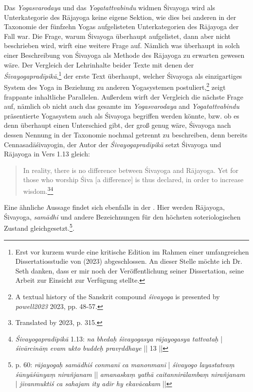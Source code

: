 Das \textit{Yogasvarodaya} und das \textit{Yogatattvabindu} widmen Śivayoga wird als Unterkategorie des Rājayoga keine eigene Sektion, wie dies bei anderen in der Taxonomie der fünfzehn Yogas aufgelisteten Unterkategorien des Rājayoga der Fall war. Die Frage, warum Śivayoga überhaupt aufgelistet, dann aber nicht beschrieben wird, wirft eine weitere Frage auf. Nämlich was überhaupt in solch einer Beschreibung von Śivayoga als Methode des Rājayoga zu erwarten gewesen wäre. Der Vergleich der Lehrinhalte beider Texte mit denen der \textit{Śivayogapradīpikā},\footnote{Erst vor kurzem wurde eine kritische Edition im Rahmen einer umfangreichen Dissertatiosstudie von \citeauthor{powell2023} (2023) abgeschlossen. An dieser Stelle möchte ich Dr. Seth \citeauthor{powell2023} danken, dass er mir noch der Veröffentlichung seiner Dissertation, seine Arbeit zur Einsicht zur Verfügung stellte.} der erste Text überhaupt, welcher Śivayoga als einzigartiges System des Yoga in Beziehung zu anderen Yogasystemen postuliert,\footnote{A textual history of the Sanskrit compound \textit{śivayoga} is presented by \textit{powell2023} 2023, pp. 48-57.} zeigt frappante inhaltliche Parallelen. Außerdem wirft der Vergleich die nächste Frage auf, nämlich ob nicht auch das gesamte im \textit{Yogasvarodaya} and \textit{Yogatattvabindu} präsentierte Yogasystem auch als Śivayoga begriffen werden könnte, bzw. ob es denn überhaupt einen Unterschied gibt, der groß genug wäre, Śivayoga nach dessen Nennung in der Taxonomie nochmal getrennt zu beschreiben, denn bereits Cennasadāśivayogin, der Autor der \textit{Śivayogapradīpikā} setzt Śivayoga und Rājayoga in Vers 1.13 gleich:
\begin{quote}
In reality, there is no difference between Śivayoga and Rājayoga. Yet for those who worship Śiva [a difference] is thus declared, in order to increase wisdom.\footnote{Translated by \citeauthor{powell2023} 2023, p. 315.}\footnote{\textit{Śivayogapradīpikā} 1.13: \textit{na bhedaḥ śivayogasya rājayogasya tattvataḥ} | \textit{śivārcināṃ evam ukto buddeḥ pravṛddhaye} || 13 ||} 
\end{quote}
Eine ähnliche Aussage findet sich ebenfalls in der . Hier werden Rājayoga, Śivayoga, \textit{samādhi} und andere Bezeichnungen für den höchsten soteriologischen Zustand gleichgesetzt.\footnote{ p. 60: \textit{rājayogaḥ samādhiś conmanī ca manonmanī} | \textit{śivayogo layastatvaṃ śūnyāśūnyaṃ nirañjanam} || \textit{amanaskaṃ yathā caitannirālambaṃ nirañjanam} | \textit{jīvanmuktiś ca sahajam ity adir hy ekavācakam} ||}.


